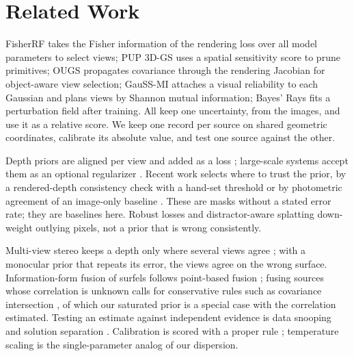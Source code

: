 \section{Related Work}
\label{sec:related}
 FisherRF \cite{unc_fisherrf} takes the Fisher information
of the rendering loss over all model parameters to select views; PUP 3D-GS \cite{unc_pup3dgs} uses a
spatial sensitivity score to prune primitives; OUGS \cite{unc_ougs} propagates covariance through the
rendering Jacobian for object-aware view selection; GauSS-MI \cite{unc_gaussmi} attaches a visual
reliability to each Gaussian and plans views by Shannon mutual information; Bayes' Rays
\cite{unc_bayesrays} fits a perturbation field after training. All keep one uncertainty, from the images,
and use it as a relative score. We keep one record per source on shared geometric coordinates, calibrate
its absolute value, and test one source against the other.

 Depth priors are aligned per view and added as a loss
\cite{gs_dnsplatter,rec_monosdf}; large-scale systems accept them as an optional regularizer
\cite{gs_hierarchical}. Recent work selects where to trust the prior, by a rendered-depth consistency
check with a hand-set threshold \cite{dep_indepthwetrust} or by photometric agreement of an image-only
baseline \cite{dep_reliability}. These are masks without a stated error rate; they are baselines here.
Robust losses and distractor-aware splatting \cite{rob_barron,gs_robustnerf,gs_spotless} down-weight
outlying pixels, not a prior that is wrong consistently.

 Multi-view stereo keeps a depth only where several views
agree \cite{fus_merrell,fus_colmap_mvs}; with a monocular prior that repeats its error, the views agree on
the wrong surface. Information-form fusion of surfels follows point-based fusion \cite{fus_keller_surfels}; fusing sources whose correlation is unknown calls for conservative
rules such as covariance intersection \cite{fus_julier_ci}, of which our saturated prior is a special
case with the correlation estimated. Testing an estimate against independent evidence is data snooping and
solution separation \cite{stat_teunissen_dia,flt_raim_joerger}. Calibration is scored with a proper rule
\cite{stat_gneiting_scoring}; temperature scaling \cite{cal_guo_temperature} is the single-parameter
analog of our dispersion.
